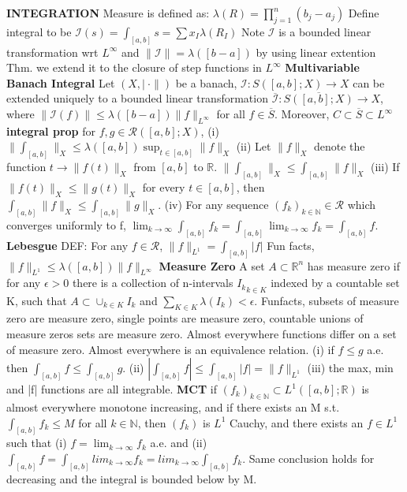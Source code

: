 \documentclass[8pt]{extarticle}
\theoremstyle{definition}
\begin{document}
\textbf{INTEGRATION} Measure is defined as: $\lambda(R) = \prod^n_{j=1} (b_j-a_j)$ Define integral to be $\mathscr{I}(s) = \int_{[a,b]} s = \sum x_I \lambda(R_I)$ Note $\mathscr{I}$ is a bounded linear transformation wrt $L^\infty$ and $\|\mathscr{I}\| = \lambda([b-a])$ by using linear extention Thm. we extend it to the closure of step functions in $L^\infty$
\textbf{Multivariable Banach Integral} Let $(X,|\ \cdot\|)$ be a banach, $\mathscr{I}:  S([a,b];X) \to X$ can be 
extended uniquely to a bounded linear transformation $ \overline{ \mathscr{I} }: \overline{S([a,b];X)}\to X$, 
where $\| \mathscr{I}(f) \|\leq \lambda([b-a]) \| f \|_{L^\infty}$ for all 
$f \in \overline S$. Moreover, $C \subset \overline S \subset L^\infty$
\textbf{integral prop} for $f,g \in \mathscr{R}([a,b];X)$, (i) $\|\int_{[a,b]} \|_X \leq \lambda([a,b])\sup_{t\in[a,b]} \|f\|_X$ (ii) Let $\|f\|_X$ denote the function $t \to \|f(t) \|_X$ from $[a,b]$ to $\mathbb{R}$. $\|\int_{[a,b]}\|_X \leq \int _{[a,b]} \|f\|_X$ (iii) If $\|f(t)\|_X \leq \|g(t)\|_X$ for every $t \in [a,b]$, then $\int_{[a,b]} \|f\|_X \leq \int_{[a,b]} \|g\|_X $. (iv) For any sequence $(f_k)_{k \in \mathbb{N}} \in \mathscr{R}$ which converges uniformly to f, $\lim_{k\to \infty} \int_{[a,b]} f_k = \int_{[a,b]} \lim_{k\to \infty} f_k = \int_{[a,b]} f$.
\textbf{Lebesgue} DEF: For any $ f \in \mathscr{R}$, $\|f\|_{L^1} = \int_{[a,b]} |f|$ Fun facts, $\|f\|_{L^1} \leq \lambda([a,b]) \|f\|_{L^\infty}$
\textbf{Measure Zero} A set $A \subset \mathbb{R}^n$ has measure zero if for any $\epsilon > 0$ there is a collection of n-intervals ${I_k}_{k \in K}$ indexed by a countable set K, such that $A \subset \cup_{k \in K}I_k$ and $\sum_{K \in K} \lambda(I_k) < \epsilon$. Funfacts, subsets of measure zero are measure zero, single points are measure zero, countable unions of measure zeros sets are measure zero. Almost everywhere functions differ on a set of measure zero. Almost everywhere is an equivalence relation. (i) if $f \leq g$ a.e. then $\int _{[a,b]} f \leq \int_{[a,b]} g$. (ii) $|\int_{[a,b]} f | \leq \int_{[a,b]} |f| = \|f\|_{L^1}$ (iii) the max, min and |f| functions are all integrable.
\textbf{MCT} if $(f_k)_{k \in \mathbb{N}} \subset L^1([a,b];\mathbb{R})$ is almost everywhere monotone increasing, and if there exists an M s.t. $\int_{[a,b]} f_k \leq M$ for all $k \in \mathbb{N}$, then $(f_k)$ is $L^1$ Cauchy, and there exists an $f \in L^1$ such that (i) $ f = \lim_{k \to \infty} f_k$ a.e. and (ii) $ \int_{[a,b]} f = \int_{[a,b]}lim_{k \to \infty} f_k = lim_{k \to \infty} \int_{[a,b]} f_k$. Same conclusion holds for decreasing and the integral is bounded below by M.
\end{document}
